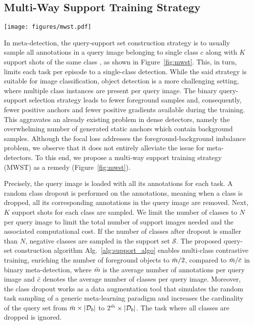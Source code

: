 \documentclass[10pt,twocolumn,letterpaper]{article}
\begin{document}
\subsection{Multi-Way Support Training Strategy}
\begin{figure*}[t!]
 \centering
 \texttt{[image: figures/mwst.pdf]}
\caption{ The left image shows the query-support set construction in a contrastive-based settings for the FSOD-RPN~\cite{FSOD-RPN}. Here, one annotation per query image is sampled along with $K$ support shots from the same class annotation and $K$-shots from a random negative class. The MWST algorithm constructs a multi-way query-support set (right), where the query image can include multiple annotations.} \label{fig:mwst}\vspace{-1em}
\end{figure*} In meta-detection, the query-support set construction strategy is to usually sample all annotations in a query image belonging to single class $c$ along with $K$ support shots of the same class \cite{FSRW, FSOD-RPN, FsDetView, DANA}, as shown in Figure~\ref{fig:mwst}. This, in turn, limits each task per episode to a single-class detection. While the said strategy is suitable for image classification, object detection is a more challenging setting, where multiple class instances are present per query image. The binary query-support selection strategy leads to fewer foreground samples and, consequently, fewer positive anchors and fewer positive gradients available during the training. This aggravates an already existing problem in dense detectors, namely the overwhelming number of generated static anchors which contain background samples. Although the focal loss addresses the foreground-background imbalance problem, we observe that it does not entirely alleviate the issue for meta-detectors. To this end, we propose a multi-way support training strategy (MWST) as a remedy (Figure~\ref{fig:mwst}).         

Precisely, the query image is loaded with all its annotations for each task. A random class dropout is performed on the annotations, meaning when a class is dropped, all its corresponding annotations in the query image are removed. Next, $K$ support shots for each class are sampled. We limit the number of classes to $N$ per query image to limit the total number of support images needed and the associated computational cost. If the number of classes after dropout is smaller than $N$, negative classes are sampled in the support set $\mathcal{S}$. The proposed query-set construction algorithm Alg.~\ref{alg:support_algo} enables multi-class contrastive training, enriching the number of foreground objects to $\Bar{m}/2$, compared to $\Bar{m}/\Bar{c}$ in binary meta-detection, where $\Bar{m}$ is the average number of annotations per query image and $\Bar{c}$ denotes the average number of classes per query image. Moreover, the class dropout works as a data augmentation tool that simulates the random task sampling of a generic meta-learning paradigm and increases the cardinality of the query set from $\Bar{m} \times \vert \mathcal{D}_b \vert$ to $2^{\Bar{m}} \times \vert \mathcal{D}_b \vert$. The task where all classes are dropped is ignored.    
\end{document}
